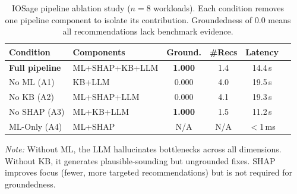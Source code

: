 \begin{table}[t]
\centering
\caption{IOSage pipeline ablation study ($n{=}8$ workloads). Each condition
removes one pipeline component to isolate its contribution. Groundedness of
0.0 means all recommendations lack benchmark evidence.}
\label{tab:ablation}
\small
\begin{tabular}{llcccc}
\toprule
\textbf{Condition} & \textbf{Components} & \textbf{Ground.} & \textbf{\#Recs} & \textbf{Latency} \\
\midrule
\textbf{Full pipeline} & ML+SHAP+KB+LLM & \textbf{1.000} & 1.4 & 14.4\,s \\
No ML (A1)             & KB+LLM         & 0.000          & 4.0 & 19.5\,s \\
No KB (A2)             & ML+SHAP+LLM   & 0.000          & 4.1 & 19.3\,s \\
No SHAP (A3)           & ML+KB+LLM     & \textbf{1.000} & 1.5 & 11.2\,s \\
ML-Only (A4)           & ML+SHAP        & N/A            & N/A & $<$1\,ms \\
\bottomrule
\end{tabular}
\vspace{1mm}
\raggedright
\footnotesize
\textit{Note:} Without ML, the LLM hallucinates bottlenecks across all
dimensions. Without KB, it generates plausible-sounding but ungrounded fixes.
SHAP improves focus (fewer, more targeted recommendations) but is not required
for groundedness.
\end{table}
